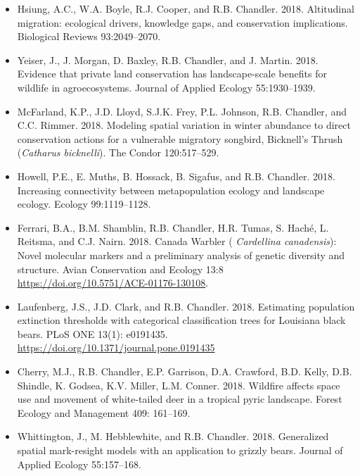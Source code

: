 \documentclass[12pt]{article}
\begin{document}
\begin{itemize}
\item Hsiung, A.C., W.A. Boyle, R.J. Cooper, and
  R.B. Chandler. 2018. Altitudinal migration: ecological drivers,
  knowledge gaps, and conservation implications. Biological Reviews 
  93:2049--2070. 

\item Yeiser, J., J. Morgan, D. Baxley, R.B. Chandler, and
  J. Martin. 2018. Evidence that private land conservation
  has landscape-scale benefits for wildlife in agroecosystems. Journal
  of Applied Ecology 55:1930--1939. 

\item McFarland, K.P., J.D. Lloyd, S.J.K. Frey, P.L. Johnson,
  R.B. Chandler, and C.C. Rimmer. 2018. Modeling spatial
  variation in winter abundance to direct conservation actions for a
  vulnerable migratory songbird, Bicknell’s Thrush ({\it Catharus
    bicknelli}). The Condor 120:517--529. 

\item Howell, P.E., E. Muths, B. Hossack, B. Sigafus, and
  R.B. Chandler. 2018. Increasing connectivity between 
  metapopulation ecology and landscape ecology. Ecology 99:1119--1128.  
  
\item Ferrari, B.A., B.M. Shamblin, R.B. Chandler, H.R. Tumas, S. Hach\'e,
  L. Reitsma, and C.J. Nairn. 2018. Canada Warbler ({\it
  Cardellina canadensis}): Novel molecular markers and a preliminary
  analysis of genetic diversity and structure. Avian Conservation and
  Ecology 13:8 \url{https://doi.org/10.5751/ACE-01176-130108}.

\item Laufenberg, J.S., J.D. Clark, and
  R.B. Chandler. 2018. Estimating population extinction thresholds 
  with categorical classification trees for Louisiana black
  bears. PLoS ONE 13(1): e0191435.
  \url{https://doi.org/10.1371/journal.pone.0191435}

\item Cherry, M.J., R.B. Chandler, E.P. Garrison, D.A. Crawford,
  B.D. Kelly, D.B. Shindle, K. Godsea, K.V. Miller,
  L.M. Conner. 2018. Wildfire affects space use and movement of
  white-tailed deer in a tropical pyric landscape. Forest Ecology and
  Management 409: 161--169. 

\item Whittington, J., M. Hebblewhite, and
  R.B. Chandler. 2018. Generalized spatial mark-resight models with an 
  application to grizzly bears. Journal of Applied Ecology
  55:157--168. 


\end{itemize}
\end{document}
